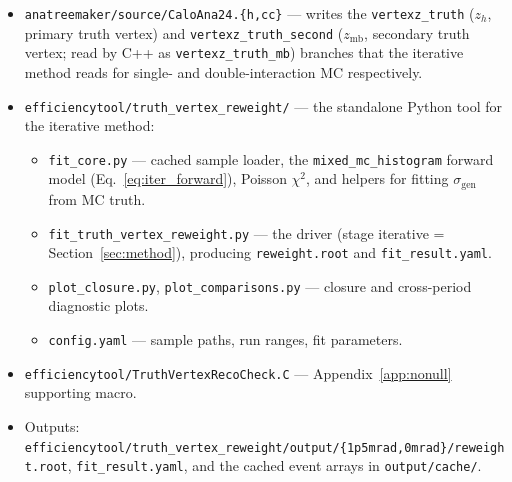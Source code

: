 \documentclass[11pt,a4paper]{article}
\begin{document}
\begin{itemize}\setlength\itemsep{1pt}
\item \texttt{anatreemaker/source/CaloAna24.\{h,cc\}} --- writes
      the \texttt{vertexz\_truth} ($z_h$, primary truth vertex) and
      \texttt{vertexz\_truth\_second} ($z_\mathrm{mb}$, secondary truth
      vertex; read by C++ as \texttt{vertexz\_truth\_mb}) branches that
      the iterative method reads for single- and double-interaction MC
      respectively.
\item \texttt{efficiencytool/truth\_vertex\_reweight/} --- the
      standalone Python tool for the iterative method:
      \begin{itemize}\setlength\itemsep{0pt}
      \item \texttt{fit\_core.py} --- cached sample loader, the
      \texttt{mixed\_mc\_histogram} forward model
      (Eq.~\ref{eq:iter_forward}), Poisson $\chi^2$, and helpers for
      fitting $\sigma_\mathrm{gen}$ from MC truth.
      \item \texttt{fit\_truth\_vertex\_reweight.py} --- the driver
      (stage iterative = Section~\ref{sec:method}), producing
      \texttt{reweight.root} and \texttt{fit\_result.yaml}.
      \item \texttt{plot\_closure.py},
      \texttt{plot\_comparisons.py} --- closure and cross-period
      diagnostic plots.
      \item \texttt{config.yaml} --- sample paths, run ranges, fit
      parameters.
      \end{itemize}
\item \texttt{efficiencytool/TruthVertexRecoCheck.C} ---
      Appendix~\ref{app:nonull} supporting macro.
\item Outputs:
      \texttt{efficiencytool/truth\_vertex\_reweight/output/\{1p5mrad,0mrad\}/reweight.root},
      \texttt{fit\_result.yaml}, and the cached event arrays in
      \texttt{output/cache/}.
\end{itemize}
\end{document}
